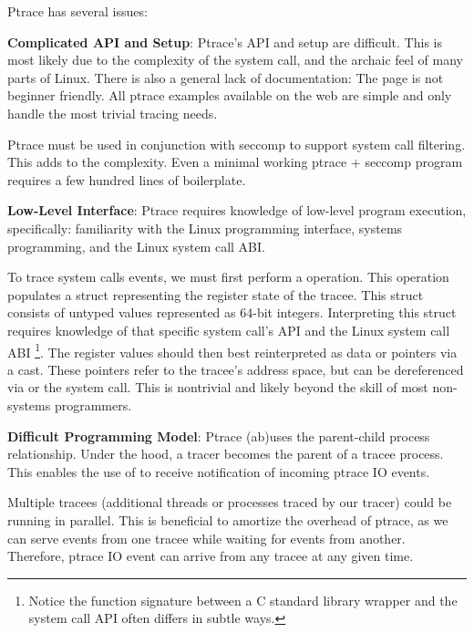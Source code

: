 Ptrace has several issues:
\begin{compactitem}
    \item \textbf{Complicated API and Setup}: Ptrace's API and setup are difficult. This is most likely due to the complexity of the system call, and the archaic feel of many parts of Linux. There is also a general lack of documentation: The  page is not beginner friendly. All ptrace examples available on the web are simple and only handle the most trivial tracing needs.
    
    Ptrace must be used in conjunction with seccomp \cite{seccomp} to support system call filtering. This adds to the complexity. Even a minimal working ptrace + seccomp program requires a few hundred lines of boilerplate.
    
    \item \textbf{Low-Level Interface}: Ptrace requires knowledge of low-level program execution, specifically: familiarity with the Linux programming interface, systems programming, and the Linux system call ABI.
    
    To trace system calls events, we must first perform a  operation. This operation populates a struct representing the register state of the tracee. This struct consists of untyped values represented as 64-bit integers. Interpreting this struct requires knowledge of that specific system call's API and the Linux system call ABI \footnote{Notice the function signature between a C standard library wrapper and the system call API often differs in subtle ways.}. The register values should then best reinterpreted as data or pointers via a cast. These pointers refer to the tracee's address space, but can be dereferenced via  or the  system call. This is nontrivial and likely beyond the skill of most non-systems programmers. 
    
    \item \textbf{Difficult Programming Model}: Ptrace (ab)uses the parent-child process relationship. Under the hood, a tracer becomes the parent of a tracee process. This enables the use of  to receive notification of incoming ptrace IO events.
    
    Multiple tracees (additional threads or processes traced by our tracer) could be running in parallel. This is beneficial to amortize the overhead of ptrace, as we can serve events from one tracee while waiting for events from another. Therefore, ptrace IO event can arrive from any tracee at any given time.
    

\end{compactitem}
